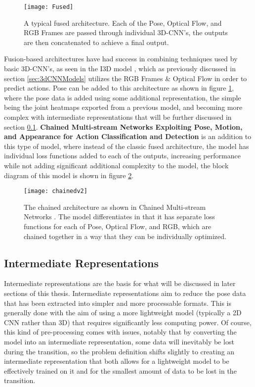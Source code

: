 \begin{figure}[ht]
	\texttt{[image: Fused]}
	\centering
	\caption{A typical fused architecture. Each of the Pose, Optical Flow, and RGB Frames are passed through individual 3D-CNN's, the outputs are then concatenated to achieve a final output.}
	\label{fig:fused}
\end{figure}

Fusion-based architectures have had success in combining techniques used by basic 3D-CNN's, as seen in the I3D model \cite{i3d}, which as previously discussed in section \ref{sec:3dCNNModels} utilizes the RGB Frames \& Optical Flow in order to predict actions. Pose can be added to this architecture as shown in figure \ref{fig:fused}, where the pose data is added using some additional representation, the simple being the joint heatmaps exported from a previous model, and becoming more complex with intermediate representations that will be further discussed in section \ref{sec:intermediate}. \textbf{Chained Multi-stream Networks Exploiting Pose, Motion, and Appearance for Action Classification and Detection} \cite{Chained} is an addition to this type of model, where instead of the classic fused architecture, the model has individual loss functions added to each of the outputs, increasing performance while not adding significant additional complexity to the model, the block diagram of this model is shown in figure \ref{fig:chained}.

\begin{figure}[ht]
	\texttt{[image: chainedv2]}
	\centering
	\caption{The chained architecture as shown in Chained Multi-stream Networks \cite{Chained}. The model differentiates in that it has separate loss functions for each of Pose, Optical Flow, and RGB, which are chained together in a way that they can be individually optimized.}
	\label{fig:chained}
\end{figure}

\subsection{Intermediate Representations}
\label{sec:intermediate}

Intermediate representations are the basis for what will be discussed in later sections of this thesis. Intermediate representations aim to reduce the pose data that has been extracted into simpler and more processable formats. This is generally done with the aim of using a more lightweight model (typically a 2D CNN rather than 3D) that requires significantly less computing power. Of course, this kind of pre-processing comes with issues, notably that by converting the model into an intermediate representation, some data will inevitably be lost during the transition, so the problem definition shifts slightly to creating an intermediate representation that both allows for a lightweight model to be effectively trained on it and for the smallest amount of data to be lost in the transition.

